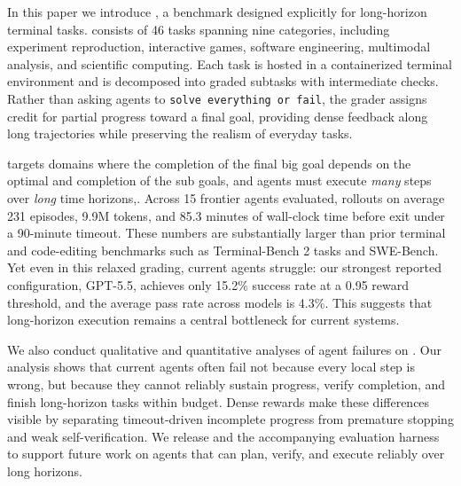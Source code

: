 In this paper we introduce \emph{\ours{}}, a benchmark designed explicitly for long-horizon terminal tasks.
%
\ours{} consists of 46 tasks spanning nine categories, including experiment reproduction, interactive games, software engineering, multimodal analysis, and scientific computing.
%
Each task is hosted in a containerized terminal environment and is decomposed into graded subtasks with intermediate checks.
%
Rather than asking agents to \texttt{solve everything or fail}, the grader assigns credit for partial progress toward a final goal, providing dense feedback along long trajectories while preserving the realism of everyday tasks.

\ours{} targets domains where the completion of the final big goal depends on the optimal and completion of the sub goals, and agents must execute \emph{many} steps over \emph{long} time horizons,.
%
Across 15 frontier agents evaluated, rollouts on \ours{} average 231 episodes, 9.9M tokens, and 85.3 minutes of wall-clock time before exit under a 90-minute timeout.
%
These numbers are substantially larger than prior terminal and code-editing benchmarks such as Terminal-Bench 2 tasks and SWE-Bench.
%
Yet even in this relaxed grading, current agents struggle: our strongest reported configuration, GPT-5.5, achieves only 15.2\% success rate at a 0.95 reward threshold, and the average pass rate across models is 4.3\%.
%
This suggests that long-horizon execution remains a central bottleneck for current systems.

We also conduct qualitative and quantitative analyses of agent failures on \ours{}.
%
Our analysis shows that current agents often fail not because every local step is wrong, but because they cannot reliably sustain progress, verify completion, and finish long-horizon tasks within budget.
%
Dense rewards make these differences visible by separating timeout-driven incomplete progress from premature stopping and weak self-verification.
%
We release \ours{} and the accompanying evaluation harness to support future work on agents that can plan, verify, and execute reliably over long horizons.